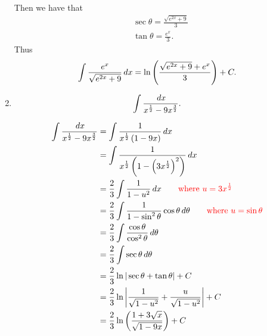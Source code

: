 \documentclass[handout,instructornotes]{ximera}
\begin{document}
\begin{problem}
\begin{enumerate}
\begin{freeResponse}
	Then we have that
		\begin{align*}
		&\sec \theta = \frac{\sqrt{e^{2x}+9}}{3} \\
		&\tan \theta = \frac{e^x}{3}.
		\end{align*}
	Thus
		\[
		\int \frac{e^x}{\sqrt{e^{2x}+9}} \,d x = \ln \left( \frac{\sqrt{e^{2x}+9} + e^x}{3} \right) + C.
		\]
	\end{freeResponse}



	\item 
	\[
	\int \frac{\,d x}{x^{\frac{1}{2}} - 9x^{\frac{3}{2}}}.
	\]
	\begin{freeResponse}
		\begin{align*}
		\int \frac{\,d x}{x^{\frac{1}{2}} - 9x^{\frac{3}{2}}}
		&= \int \frac{1}{x^{\frac{1}{2}} \left( 1 - 9x \right)} \,d x  \\
		&= \int \frac{1}{x^{\frac{1}{2}} \left( 1 - \left( 3x^{\frac{1}{2}} \right)^2 \right)} \,d x  \\
		&= \frac{2}{3} \int \frac{1}{1-u^2} \,d x 	\qquad	{\color{red}\text{where }u=3x^{\frac{1}{2}}}  \\
		&= \frac{2}{3} \int \frac{1}{1-\sin^2 \theta} \cos \theta \,d \theta	\qquad	{\color{red} \text{where } u=\sin \theta}  \\
		&= \frac{2}{3} \int \frac{\cos \theta}{\cos^2 \theta} \,d \theta  \\
		&= \frac{2}{3} \int \sec \theta \,d \theta  \\
		&= \frac{2}{3} \ln | \sec \theta + \tan \theta | + C  \\
		&= \frac{2}{3} \ln \left| \frac{1}{\sqrt{1-u^2}} + \frac{u}{\sqrt{1-u^2}} \right| + C  \\
		&= \frac{2}{3} \ln \left( \frac{1 + 3\sqrt{x}}{\sqrt{1-9x}} \right) + C
		\end{align*}
		

\end{freeResponse}
\end{enumerate}
\end{problem}
\end{document}

